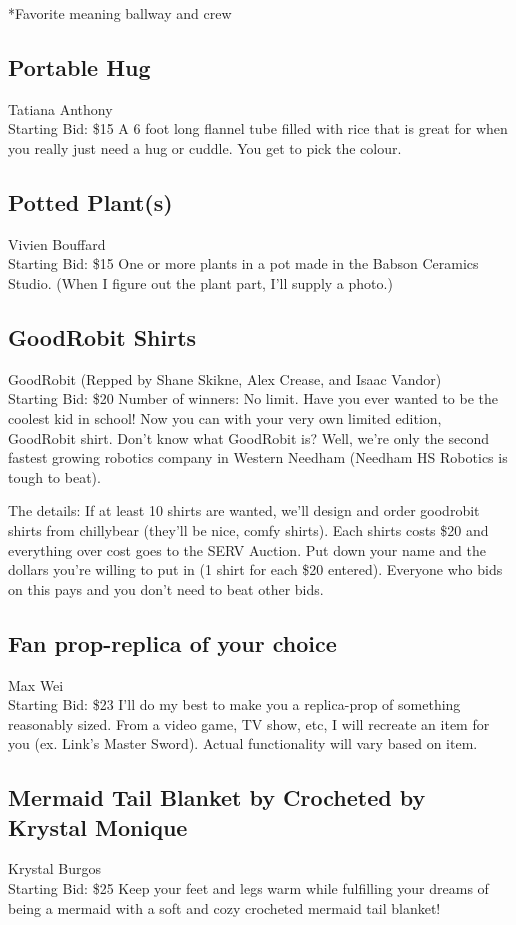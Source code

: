 \documentclass[11pt]{article}
\begin{document}
*Favorite meaning ballway and crew
\subsection{Portable Hug}
Tatiana Anthony
\\
Starting Bid: \$15
\newline
A 6 foot long flannel tube filled with rice that is great for when you really just need a hug or cuddle. You get to pick the colour.
\subsection{Potted Plant(s)}
Vivien Bouffard
\\
Starting Bid: \$15
\newline
One or more plants in a pot made in the Babson Ceramics Studio.  (When I figure out the plant part, I'll supply a photo.)
\subsection{GoodRobit Shirts}
GoodRobit (Repped by Shane Skikne, Alex Crease, and Isaac Vandor)
\\
Starting Bid: \$20
\newline
Number of winners: No limit.
\newline
Have you ever wanted to be the coolest kid in school! Now you can with your very own limited edition, GoodRobit shirt. Don't know what GoodRobit is? Well, we're only the second fastest growing robotics company in Western Needham (Needham HS Robotics is tough to beat).

The details: If at least 10 shirts are wanted, we'll design and order goodrobit shirts from chillybear (they'll be nice, comfy shirts). Each shirts costs \$20 and everything over cost goes to the SERV Auction.  Put down your name and the dollars you're willing to put in (1 shirt for each \$20 entered). Everyone who bids on this pays and you don't need to beat other bids.
\subsection{Fan prop-replica of your choice}
Max Wei
\\
Starting Bid: \$23
\newline
I'll do my best to make you a replica-prop of something reasonably sized.  From a video game, TV show, etc, I will recreate an item for you  (ex. Link's Master Sword).  Actual functionality will vary based on item.
\subsection{Mermaid Tail Blanket by Crocheted by Krystal Monique}
Krystal Burgos
\\
Starting Bid: \$25
\newline
Keep your feet and legs warm while fulfilling your dreams of being a mermaid with  a soft and cozy crocheted mermaid tail blanket!
\end{document}
